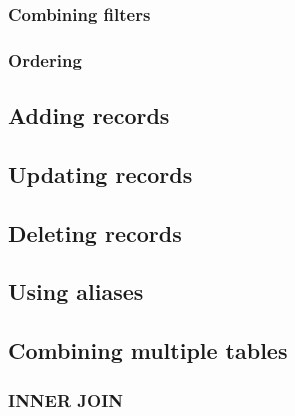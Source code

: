\documentclass[12pt]{article} %
\begin{document}

\subsubsection{Combining filters} %


\subsubsection{Ordering} %


\subsection{Adding records} %


\subsection{Updating records} %


\subsection{Deleting records} %


\subsection{Using aliases} %


\subsection{Combining multiple tables} %


\subsubsection{INNER JOIN} %
\end{document}
